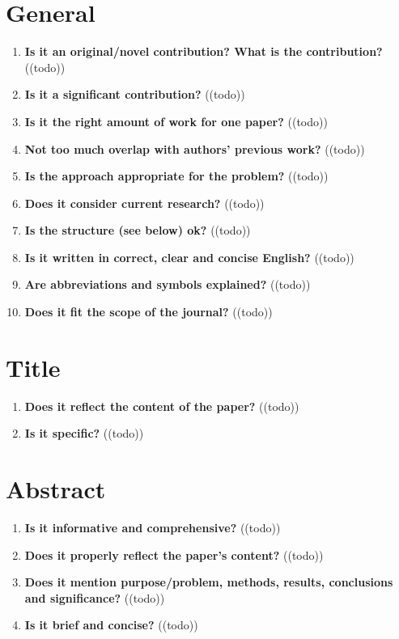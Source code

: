 \section{General}\label{sec:general}
\begin{enumerate}[resume]
    \item \textbf{Is it an original/novel contribution? What is the contribution?} \textcolor{HighlightColor}{((todo))}
    \item \textbf{Is it a significant contribution?} 	\textcolor{HighlightColor}{((todo))}
    \item \textbf{Is it the right amount of work for one paper?} 	\textcolor{HighlightColor}{((todo))}
    \item \textbf{Not too much overlap with authors’ previous work?} 	\textcolor{HighlightColor}{((todo))}
    \item \textbf{Is the approach appropriate for the problem?} 	\textcolor{HighlightColor}{((todo))}
    \item \textbf{Does it consider current research?} 	\textcolor{HighlightColor}{((todo))}
    \item \textbf{Is the structure (see below) ok?} 	\textcolor{HighlightColor}{((todo))}
    \item \textbf{Is it written in correct, clear and concise English?} 	\textcolor{HighlightColor}{((todo))}
    \item \textbf{Are abbreviations and symbols explained?} 	\textcolor{HighlightColor}{((todo))}
    \item \textbf{Does it fit the scope of the journal?} 	\textcolor{HighlightColor}{((todo))}
\end{enumerate}

\section{Title}\label{sec:title}
\begin{enumerate}[resume]
    \item \textbf{Does it reflect the content of the paper?} 	\textcolor{HighlightColor}{((todo))}
    \item \textbf{Is it specific?} 	\textcolor{HighlightColor}{((todo))}
\end{enumerate}

\section{Abstract}\label{sec:abstract}
\begin{enumerate}[resume]
    \item \textbf{Is it informative and comprehensive?} 	\textcolor{HighlightColor}{((todo))}
    \item \textbf{Does it properly reflect the paper’s content?} 	\textcolor{HighlightColor}{((todo))}
    \item \textbf{Does it mention purpose/problem, methods, results, conclusions and significance?} 	\textcolor{HighlightColor}{((todo))}
    \item \textbf{Is it brief and concise?} 	\textcolor{HighlightColor}{((todo))}
\end{enumerate}

